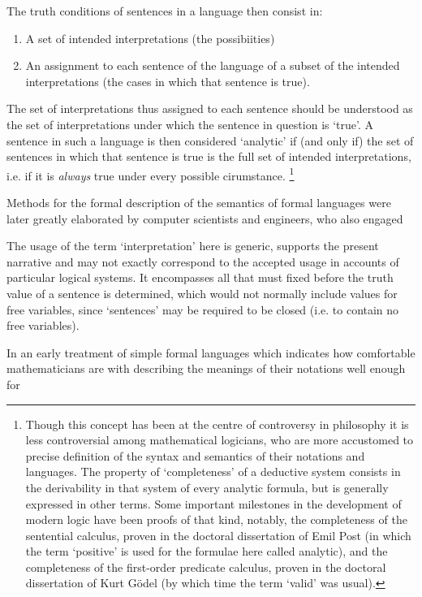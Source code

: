 \documentclass[10pt,titlepage]{article}
\begin{document}
The truth conditions of sentences in a language then consist in:

\begin{enumerate}
\item A set of intended interpretations (the possibiities)
  \item An assignment to each sentence of the language of a subset of the intended interpretations (the cases in which that sentence is true).
\end{enumerate}

The set of interpretations thus assigned to each sentence should be understood as the set of interpretations under which the sentence in question is `true'.
A sentence in such a language is then considered `analytic' if (and only if) the set of sentences in which that sentence is true is the full set of intended interpretations, i.e. if it is \emph{always} true under every possible cirumstance.
\footnote{
Though this concept has been at the centre of controversy in philosophy it is less controversial among mathematical logicians, who are more accustomed to precise definition of the syntax and semantics of their notations and languages.
The property of `completeness' of a deductive system consists in the derivability in that system of every analytic formula, but is generally expressed in other terms.
Some important milestones in the development of modern logic have been proofs of that kind, notably, the completeness of the sentential calculus, proven in the doctoral dissertation of Emil Post \cite{post21}(in which the term `positive' is used for the formulae here called analytic), and the completeness of the first-order predicate calculus, proven in the doctoral dissertation of Kurt G\"{o}del \cite{godel30a} (by which time the term `valid' was usual).
}

Methods for the formal description of the semantics of formal languages were later greatly elaborated by computer scientists and engineers, who also engaged 


The usage of the term `interpretation' here is generic, supports the present narrative and may not exactly correspond to the accepted usage in accounts of particular logical systems.
It encompasses all that must fixed before the truth value of a sentence is determined, which would not normally include values for free variables, since `sentences' may be required to be closed (i.e. to contain no free variables).

In an early treatment of simple formal languages which indicates how comfortable mathematicians are with describing the meanings of their notations well enough for 
\end{document}
